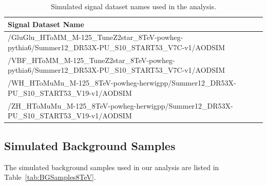 \documentclass[12pt]{article}
\begin{document}
\begin{table}[htb]
\caption{Simulated signal dataset names used in the analysis.
\label{tab:sigDatasets}
}
\small
\begin{center}
\begin{tabular}{ |p{12cm}|}
\hline
Signal Dataset Name \\
\hline
\hline
/GluGlu\_HToMM\_M-125\_TuneZ2star\_8TeV-powheg-pythia6/Summer12\_DR53X-PU\_S10\_START53\_V7C-v1/AODSIM \\
\hline
/VBF\_HToMM\_M-125\_TuneZ2star\_8TeV-powheg-pythia6/Summer12\_DR53X-PU\_S10\_START53\_V7C-v1/AODSIM \\
\hline
/WH\_HToMuMu\_M-125\_8TeV-powheg-herwigpp/Summer12\_DR53X-PU\_S10\_START53\_V19-v1/AODSIM \\
\hline
/ZH\_HToMuMu\_M-125\_8TeV-powheg-herwigpp/Summer12\_DR53X-PU\_S10\_START53\_V19-v1/AODSIM \\
\hline
\end{tabular}
\end{center}
\end{table}


\subsection{Simulated Background Samples}

The simulated background samples used in our analysis are listed in 
Table~\ref{tab:BGSamples8TeV}.
\end{document}
